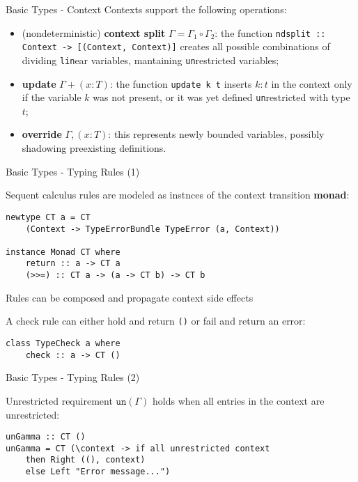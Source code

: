 \begin{frame}[fragile]{Basic Types - Context}
    Contexts support the following operations:
    \begin{itemize}
        \item (nondeterministic) \textbf{context split} $\Gamma = \Gamma_1 \circ \Gamma_2$: the function \texttt{ndsplit :: Context -> [(Context, Context)]} creates all possible combinations of dividing \texttt{lin}ear variables, mantaining \texttt{un}restricted variables;
        \item \textbf{update} $\Gamma + (x : T)$: the function \texttt{update k t} inserts $k : t$ in the context only if the variable $k$ was not present, or it was yet defined \texttt{un}restricted with type $t$;
        \item \textbf{override} $\Gamma, (x : T)$: this represents newly bounded variables, possibly shadowing preexisting definitions.
    \end{itemize}
\end{frame}

\begin{frame}[fragile]{Basic Types - Typing Rules (1)}

    Sequent calculus rules are modeled as instnces of the context transition \textbf{monad}:

    \begin{verbatim}
newtype CT a = CT 
    (Context -> TypeErrorBundle TypeError (a, Context))

instance Monad CT where
    return :: a -> CT a
    (>>=) :: CT a -> (a -> CT b) -> CT b
\end{verbatim}
    Rules can be composed and propagate context side effects

    A check rule can either hold and return \texttt{()} or fail and return an error:
    \begin{verbatim}
class TypeCheck a where
    check :: a -> CT ()
    \end{verbatim}

\end{frame}

\begin{frame}[fragile]{Basic Types - Typing Rules (2)}

    \begin{exampleblock}{Unrestricted requirement}
        $\texttt{un}(\Gamma)$ holds when all entries in the context are unrestricted:
\vspace{0.5cm}
        \begin{verbatim}
unGamma :: CT ()
unGamma = CT (\context -> if all unrestricted context
    then Right ((), context)
    else Left "Error message...")  
        \end{verbatim}
    \end{exampleblock}
\end{frame}

